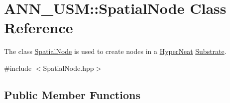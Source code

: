 \hypertarget{class_a_n_n___u_s_m_1_1_spatial_node}{\section{A\-N\-N\-\_\-\-U\-S\-M\-:\-:Spatial\-Node Class Reference}
\label{class_a_n_n___u_s_m_1_1_spatial_node}
}


The class \hyperlink{class_a_n_n___u_s_m_1_1_spatial_node}{Spatial\-Node} is used to create nodes in a \hyperlink{class_a_n_n___u_s_m_1_1_hyper_neat}{Hyper\-Neat} \hyperlink{class_a_n_n___u_s_m_1_1_substrate}{Substrate}.  




{\ttfamily \#include $<$Spatial\-Node.\-hpp$>$}

\subsection*{Public Member Functions}
